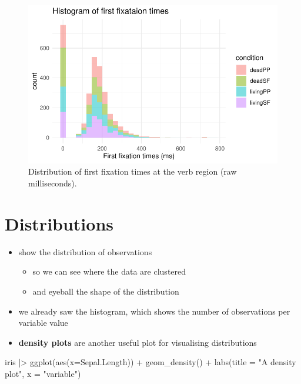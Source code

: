 \documentclass[
  letterpaper,
  DIV=11,
  numbers=noendperiod]{scrartcl}
\newenvironment{Shaded}{\begin{snugshade}}{\end{snugshade}}
\newcommand{\AttributeTok}[1]{\textcolor[rgb]{0.40,0.45,0.13}{#1}}
\newcommand{\FunctionTok}[1]{\textcolor[rgb]{0.28,0.35,0.67}{#1}}
\newcommand{\NormalTok}[1]{\textcolor[rgb]{0.00,0.23,0.31}{#1}}
\newcommand{\SpecialCharTok}[1]{\textcolor[rgb]{0.37,0.37,0.37}{#1}}
\newcommand{\StringTok}[1]{\textcolor[rgb]{0.13,0.47,0.30}{#1}}
\providecommand{\tightlist}{%
  \setlength{\itemsep}{0pt}\setlength{\parskip}{0pt}}\usepackage{longtable,booktabs,array}
\begin{document}
\begin{figure}[H]

{\centering \includegraphics{_data_viz_files/figure-pdf/unnamed-chunk-16-1.pdf}

}

\caption{Distribution of first fixation times at the verb region (raw
milliseconds).}

\end{figure}

\hypertarget{distributions}{%
\section{Distributions}\label{distributions}}

\begin{itemize}
\tightlist
\item
  show the distribution of observations

  \begin{itemize}
  \tightlist
  \item
    so we can see where the data are clustered
  \item
    and eyeball the shape of the distribution
  \end{itemize}
\item
  we already saw the histogram, which shows the number of observations
  per variable value
\item
  \textbf{density plots} are another useful plot for visualising
  distributions
\end{itemize}

\begin{Shaded}
\begin{Highlighting}[]
\NormalTok{iris }\SpecialCharTok{|\textgreater{}} 
  \FunctionTok{ggplot}\NormalTok{(}\FunctionTok{aes}\NormalTok{(}\AttributeTok{x=}\NormalTok{Sepal.Length)) }\SpecialCharTok{+}
  \FunctionTok{geom\_density}\NormalTok{() }\SpecialCharTok{+}
  \FunctionTok{labs}\NormalTok{(}\AttributeTok{title =} \StringTok{"A density plot"}\NormalTok{,}
       \AttributeTok{x =} \StringTok{"variable"}\NormalTok{)}
\end{Highlighting}
\end{Shaded}
\end{document}
